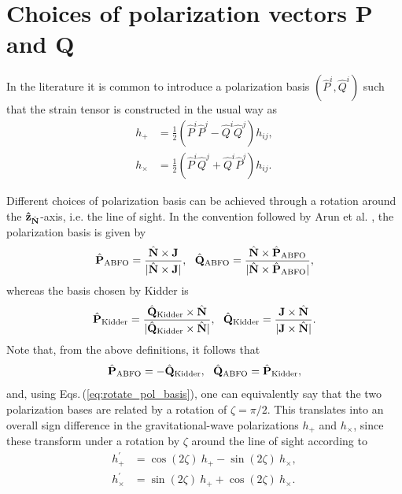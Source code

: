 \documentclass[%
aps,
prd,
amssymb,
amsmath,
amsfonts,
eqsecnum,
showpacs,
nofootinbib,
floatfix,
twocolumn,
twoside,
a4paper,
superscriptaddress
]{revtex4-1}
\newcommand{\z}{\mathbf{\hat{z}}}
\newcommand{\hN}{{\hat{\bf{N}}}}
\newcommand{\hP}{{\hat{\bf{P}}}}
\newcommand{\hQ}{{\hat{\bf{Q}}}}
\newcommand{\J}{\mathbf{J}}
\begin{document}

\section{Choices of polarization vectors P and Q}
\label{appendix:polarizations}

In the literature it is common to introduce a polarization basis 
$(\hat{P}^i, \hat{Q}^i)$ such that
the strain tensor is constructed in the usual way as \cite{Arun:2008kb,Schmidt:2017btt}
\begin{align}
    h_{+} &= \frac{1}{2} \left( \hat{P}^i \hat{P}^j - \hat{Q}^i \hat{Q}^j \right) h_{ij} , \\
    h_{\times} &= \frac{1}{2} \left( \hat{P}^i \hat{Q}^j + \hat{Q}^i \hat{P}^j \right) h_{ij} .
\end{align}

Different choices of polarization basis can be achieved through a rotation around the $\z_{\hN}$-axis, i.e. the line of sight. 
In the convention followed by Arun et al. \cite{Arun:2008kb}, the polarization basis is given by 
\begin{equation}
\label{eq:Arun}
  \hP_{\rm{ABFO}} = \frac{\hN \times \J}{|\hN \times \J|}, \:\:\: \hQ_{\rm{ABFO}} = \frac{\hN \times \hP_{\rm{ABFO}}}{|\hN \times \hP_{\rm{ABFO}}|},  
\end{equation}
whereas the basis chosen by Kidder \cite{Kidder:1995zr} is 
\begin{equation}
\label{eq:Kidder}
  \hP_{\rm{Kidder}} = \frac{\hQ_{\rm{Kidder}} \times \hN}{|\hQ_{\rm{Kidder}} \times \hN|}, \:\:\: 
  \hQ_{\rm{Kidder}} = \frac{\J \times \hN}{|\J \times \hN|}.
\end{equation}
Note that, from the above definitions, it follows that
\begin{equation}
    \hP_{\rm{ABFO}} = -\hQ_{\rm{Kidder}}, \:\:\: \hQ_{\rm{ABFO}} = \hP_{\rm{Kidder}},
\end{equation}
and, using Eqs.\,(\ref{eq:rotate_pol_basis}), one can equivalently say that the two polarization bases are related by a rotation of $\zeta = \pi/2$.
This translates into an overall sign difference in the gravitational-wave polarizations $h_{+}$ and $h_{\times}$, since these transform under a rotation by $\zeta$ around the line of sight according to
\begin{align}
    h^{\prime}_+ &= \cos (2\zeta) \: h_+ - \sin ({2\zeta}) \: h_{\times}, \\
    h^{\prime}_{\times} &= \sin (2\zeta) \: h_+ + \cos ({2\zeta}) \: h_{\times}.
\end{align}
\end{document}
